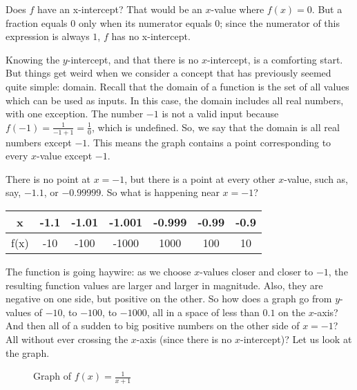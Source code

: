 Does \( f \) have an x-intercept? That would be an \( x \)-value where \( f(x) = 0 \). But a fraction equals \( 0 \) only when its numerator equals \( 0 \); since the numerator of this expression is always \( 1 \), \( f \) has no x-intercept. 

Knowing the \( y \)-intercept, and that there is no \( x \)-intercept, is a comforting start. But things get weird when we consider a concept that has previously seemed quite simple: domain. Recall that the domain of a function is the set of all values which can be used as inputs. In this case, the domain includes all real numbers, with one exception. The number \( -1 \) is not a valid input because \( f(-1) = \frac{1}{-1+1} = \frac{1}{0} \), which is undefined. So, we say that the domain is all real numbers except \( -1 \). This means the graph contains a point corresponding to every \( x \)-value except \( -1 \).

There is no point at \( x = -1 \), but there is a point at every other \( x \)-value, such as, say, \( -1.1 \), or \( -0.99999 \). So what is happening near \( x = -1 \)?

\begin{center}
\begin{tabular}{ |c|c|c|c|c|c|c| } 
 \hline
 x & -1.1 & -1.01 & -1.001 & -0.999 & -0.99 & -0.9 \\ 
 \hline
 f(x) & -10 & -100 & -1000 & 1000 & 100 & 10 \\ 
 \hline
\end{tabular}
\end{center}

The function is going haywire: as we choose \( x \)-values closer and closer to \( -1 \), the resulting function values are larger and larger in magnitude. Also, they are negative on one side, but positive on the other. So how does a graph go from \( y \)-values of \( -10 \), to \( -100 \), to \( -1000 \), all in a space of less than \( 0.1 \) on the \( x \)-axis? And then all of a sudden to big positive numbers on the other side of \( x = -1 \)? All without ever crossing the \( x \)-axis (since there is no \( x \)-intercept)? Let us look at the graph.

\begin{figure}[htbp]
  \centering
  \caption{Graph of \( f(x) = \frac{1}{x+1} \)}
\end{figure}

